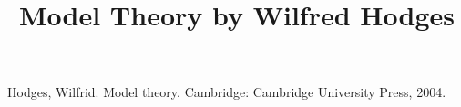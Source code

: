 \documentclass[a4paper]{article}
\title{Model Theory by Wilfred Hodges}
\date{}
\begin{document}
\maketitle
\par{Hodges, Wilfrid. Model theory. Cambridge: Cambridge University Press, 2004.}
\printbibliography
\end{document}
